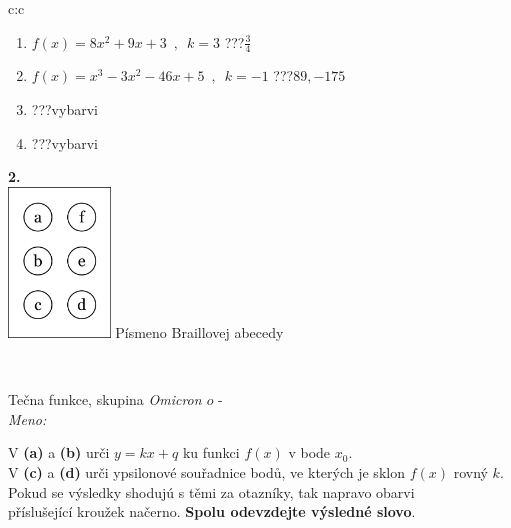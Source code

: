 \documentclass[10pt]{report}
\newcommand\omicron{o}
\begin{document}
\begin{tabular}{c:c}
\begin{minipage}[c][104.5mm][t]{0.5\linewidth}
\begin{center}
\begin{minipage}{0.79\linewidth}
\begin{center}
\begin{varwidth}{\linewidth}
\begin{enumerate}
\item $f(x)=8x^2+9x+3\enspace , \enspace k=3$\quad \dotfill\; ???\;\dotfill \quad $\frac{3}{4}$
\item $f(x)=x^3-3x^2-46x+5\enspace , \enspace k=-1$\quad \dotfill\; ???\;\dotfill \quad $89 , -175$
\item \quad \dotfill\; ???\;\dotfill \quad vybarvi
\item \quad \dotfill\; ???\;\dotfill \quad vybarvi
\end{enumerate}
\end{varwidth}
\end{center}
\end{minipage}
\begin{minipage}{0.20\linewidth}
\begin{center}
{\Huge\bfseries 2.} \\[2mm]
\includegraphics[height=40mm]{../images/braille.png}
{\small Písmeno Braillovej abecedy}
\end{center}
\end{minipage}
\end{center}
\end{minipage}
\\ \hdashline
\begin{minipage}[c][104.5mm][t]{0.5\linewidth}
\begin{center}
\vspace{7mm}
{\huge Tečna funkce, skupina \textit{Omicron $\omicron$} -}\\[5mm]
\textit{Meno:}\phantom{xxxxxxxxxxxxxxxxxxxxxxxxxxxxxxxxxxxxxxxxxxxxxxxxxxxxxxxxxxxxxxxxx}\\[5mm]
\begin{minipage}{0.95\linewidth}
\begin{center}
V \textbf{(a)} a \textbf{(b)} urči  $y = kx + q$ ku funkci $f(x)$ v bode $x_0$.\\V \textbf{(c)} a \textbf{(d)} urči ypsilonové souřadnice bodů, ve kterých je sklon $f(x)$ rovný $k$.\\Pokud se výsledky shodujú s těmi za otazníky, tak napravo obarvi\\příslušející kroužek načerno. \textbf{Spolu odevzdejte výsledné slovo}.

\end{center}
\end{minipage}
\end{center}
\end{minipage}
\end{tabular}
\end{document}
